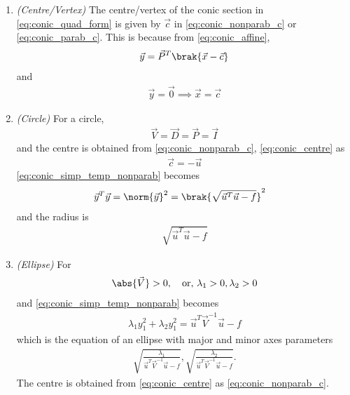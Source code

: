 \begin{enumerate}[label=\thesection.\arabic*.,ref=\thesection.\theenumi]
%
\item {\em (Centre/Vertex)}
The centre/vertex of the conic section in \eqref{eq:conic_quad_form} is given by $\vec{c}$ in \eqref{eq:conic_nonparab_c} or \eqref{eq:conic_parab_c}.  This is because from \eqref{eq:conic_affine},
\begin{align}
\label{eq:conic_affine_inv}
\vec{y} = \vec{P}^T\brak{\vec{x}-\vec{c}}
\end{align}
and 
\begin{align}
\label{eq:conic_centre}
\vec{y} = \vec{0} \implies \vec{x}=\vec{c}
\end{align}
%
\item {\em (Circle)}
For a circle, 
\begin{align}
\vec{V}=\vec{D}= \vec{P} = \vec{I}
\end{align}
and the centre is obtained from \eqref{eq:conic_nonparab_c}, \eqref{eq:conic_centre}
as
\begin{align}
\label{eq:conic_circ_centre}
\vec{c} = -\vec{u}
\end{align}
\eqref{eq:conic_simp_temp_nonparab}
becomes
\begin{align}
\vec{y}^T\vec{y} &=  \norm{\vec{y}}^2=\brak{\sqrt{\vec{u}^T\vec{u} -f}}^2
\label{eq:conic_simp_temp_circ}
\end{align}
 and the radius is \begin{align} \sqrt{\vec{u}^T\vec{u} -f} \label{eq:conic_simp_temp_circ_rad} \end{align} 

\item {\em (Ellipse) } For \begin{align} \abs{\vec{V}} > 0, \quad \text{or, } \lambda_1 > 0, \lambda_2 > 0 
\end{align} and \eqref{eq:conic_simp_temp_nonparab} becomes \begin{align} \lambda_1y_1^2 +\lambda_2y_1^2 = 
\vec{u}^T\vec{V}^{-1}\vec{u} -f \end{align} which is the equation of an ellipse with major and minor axes 
parameters \begin{align} \sqrt{\frac{\lambda_1}{\vec{u}^T\vec{V}^{-1}\vec{u} -f}}, 
\sqrt{\frac{\lambda_2}{\vec{u}^T\vec{V}^{-1}\vec{u} -f}}. \end{align} The centre is obtained from 
\eqref{eq:conic_centre} as \eqref{eq:conic_nonparab_c}. 


\end{enumerate}

